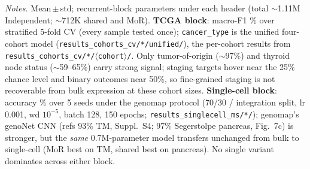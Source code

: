 \documentclass[11pt]{article}
\begin{document}
\vspace{0.3em}
\noindent\footnotesize
\textit{Notes.} Mean\,$\pm$\,std; recurrent-block parameters under each header (total
$\sim$1.11M Independent; $\sim$712K shared and MoR). \textbf{TCGA block}: macro-F1 \% over
stratified 5-fold CV (every sample tested once); \texttt{cancer\_type} is the unified
four-cohort model (\texttt{results\_cohorts\_cv/*/unified/}), the per-cohort results from
\texttt{results\_cohorts\_cv/*/$\langle$cohort$\rangle$/}. Only tumor-of-origin ($\sim$97\%)
and thyroid node status ($\sim$59--65\%) carry strong signal; staging targets hover near the
25\% chance level and binary outcomes near 50\%, so fine-grained staging is not recoverable
from bulk expression at these cohort sizes. \textbf{Single-cell block}: accuracy \% over 5
seeds under the genomap protocol (70/30 / integration split, lr 0.001, wd $10^{-5}$, batch
128, 150 epochs; \texttt{results\_singlecell\_ms/*/}); genomap's genoNet CNN (refs 93\% TM,
Suppl.\ S4; 97\% Segerstolpe pancreas, Fig.~7c) is stronger, but the \emph{same} 0.7M-parameter
model transfers unchanged from bulk to single-cell (MoR best on TM, shared best on pancreas).
No single variant dominates across either block.
\end{document}
